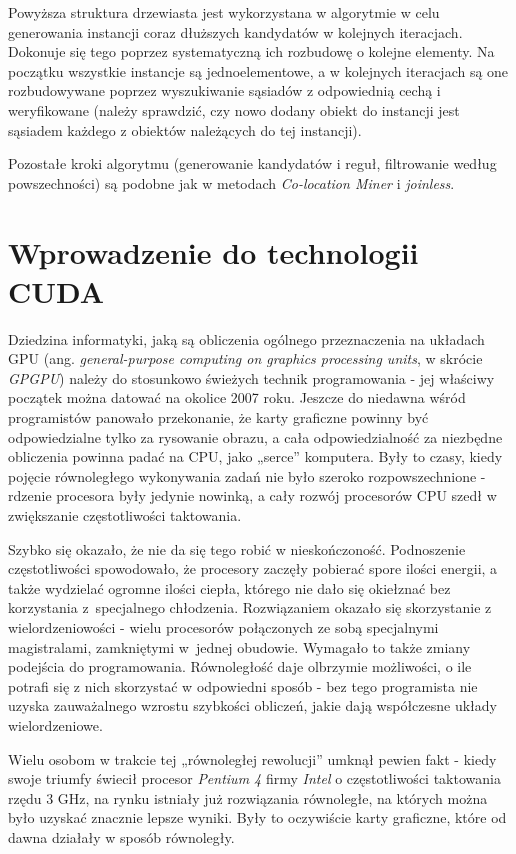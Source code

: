 \documentclass[12pt]{article}
\begin{document}
Powyższa struktura drzewiasta jest wykorzystana w algorytmie w celu generowania instancji coraz dłuższych kandydatów w kolejnych iteracjach. Dokonuje się tego poprzez systematyczną ich rozbudowę o kolejne elementy. Na początku wszystkie instancje są jednoelementowe, a w kolejnych iteracjach są one rozbudowywane poprzez wyszukiwanie sąsiadów z odpowiednią cechą i weryfikowane (należy sprawdzić, czy nowo dodany obiekt do instancji jest sąsiadem każdego z obiektów należących do tej instancji). 

Pozostałe kroki algorytmu (generowanie kandydatów i reguł, filtrowanie według powszechności) są podobne jak w metodach \textit{Co-location Miner} i \textit{joinless}.

\newpage

\section{Wprowadzenie do technologii CUDA}
\label{sec:cuda}

Dziedzina informatyki, jaką są obliczenia ogólnego przeznaczenia na układach GPU (ang. \textit{general-purpose computing on graphics processing units}, w skrócie \textit{GPGPU}) należy do stosunkowo świeżych technik programowania - jej właściwy początek można datować na okolice 2007 roku. Jeszcze do niedawna wśród programistów panowało przekonanie, że karty graficzne powinny być odpowiedzialne tylko za rysowanie obrazu, a cała odpowiedzialność za niezbędne obliczenia powinna padać na CPU, jako „serce” komputera. Były to czasy, kiedy pojęcie równoległego wykonywania zadań nie było szeroko rozpowszechnione - rdzenie procesora były jedynie nowinką, a cały rozwój procesorów CPU szedł w zwiększanie częstotliwości taktowania.

Szybko się okazało, że nie da się tego robić w nieskończoność. Podnoszenie częstotliwości spowodowało, że procesory zaczęły pobierać spore ilości energii, a także wydzielać ogromne ilości ciepła, którego nie dało się okiełznać bez korzystania z~specjalnego chłodzenia. Rozwiązaniem okazało się skorzystanie z wielordzeniowości - wielu procesorów połączonych ze sobą specjalnymi magistralami, zamkniętymi w~jednej obudowie. Wymagało to także zmiany podejścia do programowania. Równoległość daje olbrzymie możliwości, o ile potrafi się z nich skorzystać w odpowiedni sposób - bez tego programista nie uzyska zauważalnego wzrostu szybkości obliczeń, jakie dają współczesne układy wielordzeniowe. 

Wielu osobom w trakcie tej „równoległej rewolucji” umknął pewien fakt - kiedy swoje triumfy świecił procesor \textit{Pentium 4} firmy \textit{Intel} o częstotliwości taktowania rzędu 3 GHz, na rynku istniały już rozwiązania równoległe, na których można było uzyskać znacznie lepsze wyniki. Były to oczywiście karty graficzne, które od dawna działały w sposób równoległy. 
\end{document}
